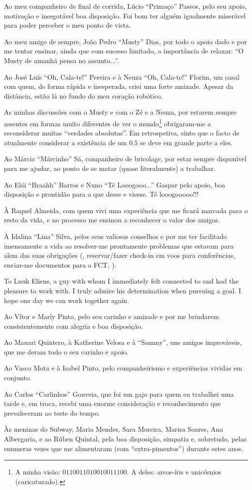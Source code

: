 Ao meu companheiro de final de corrida, Lúcio ``Primaço'' Passos, pelo
seu apoio, motivação e inesgotável boa disposição. Foi bom ter alguém
igualmente miserável para poder perceber o meu ponto de vista.


Ao meu amigo de sempre, João Pedro ``Musty'' Dias, por todo o apoio
dado e por me tentar ensinar, ainda que com sucesso limitado, a
importância de relaxar: ``O Musty de amanhã pensa no assunto...''.

Ao José Luís ``Oh, Cala-te!'' Pereira e à Neuza ``Oh, Cala-te!'' Florim,
um casal com quem, de forma rápida e inesperada, criei uma forte
amizade.
%
Apesar da distância, estão lá no fundo do meu coração robótico.

As minhas discussões com o Musty e com o Zé e a Neuza, por estarem
sempre assentes em formas muito diferentes de ver o mundo\footnote{A
  minha visão: $0110011010010011100$. A deles: arcos-íris e unicórnios
  (caricaturado).} obrigaram-me a reconsiderar muitas ``verdades
absolutas''.
%
Em retrospetiva, sinto que o facto de atualmente considerar a
existência de um $0.5$ se deve em grande parte a eles.


Ao Márcio ``Márcinho'' Sá, companheiro de bricolage, por estar sempre
disponível para me ajudar, ao ponto de se matar (quase literalmente) a
trabalhar.

Ao Elói ``Braahh'' Barros e Nuno ``Té Looogooo...'' Gaspar pelo apoio,
boa disposição e prontidão para o que desse e viesse. Té looogooooo!!!


À Raquel Almeida, com quem vivi uma experiência que me ficará marcada
para o resto da vida, e no processo me ensinou a reconhecer o valor
dos amigos.

À Idalina ``Lina'' Silva, pelos seus valiosos conselhos e por me ter
facilitado imensamente a vida ao resolver-me prontamente problemas que
estavam para alem das suas obrigações (\eg, reservar/fazer check-in em
voos para conferências, enviar-me documentos para a FCT, \etc).


To Luuk Eliens, a guy with whom I immediately felt connected to and
had the pleasure to work with. I truly admire his determination when
pursuing a goal. I hope one day we can work together again.

Ao Vítor e Marly Pinto, pelo seu carinho e amizade e por me brindarem
consistentemente com alegria e boa disposição.

Ao Mauari Quintero, à Katherine Velosa e à ``Sammy'', uns amigos
improváveis, que me deram todo o seu carinho e apoio.

Ao Vasco Mota e à Isabel Pinto, pelo companheirismo e experiências
vividas em conjunto.

Ao Carlos ``Carlinhos'' Gouveia, que foi um gajo para quem eu
trabalhei uma tarde e, em troca, recebi uma enorme consideração e
reconhecimento que prevaleceram ao teste do tempo.

Às meninas do Subway, Maria Mendes, Sara Moreira, Marisa Soares, Ana
Albergaria, e ao Rúben Quintal, pela boa disposição, simpatia e,
sobretudo, pelas enumeras vezes que me alimentaram (com
``extra-pimentos'') durante estes anos.
